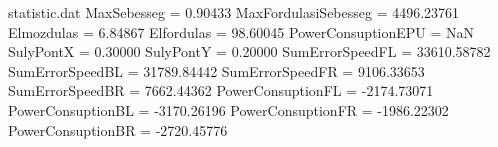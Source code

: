 \begin{filecontents*}{statistic.dat}
MaxSebesseg =    0.90433
MaxFordulasiSebesseg = 4496.23761
Elmozdulas =    6.84867
Elfordulas =   98.60045
PowerConsuptionEPU =        NaN
SulyPontX =    0.30000
SulyPontY =    0.20000
SumErrorSpeedFL = 33610.58782
SumErrorSpeedBL = 31789.84442
SumErrorSpeedFR = 9106.33653
SumErrorSpeedBR = 7662.44362
PowerConsuptionFL = -2174.73071
PowerConsuptionBL = -3170.26196
PowerConsuptionFR = -1986.22302
PowerConsuptionBR = -2720.45776
\end{filecontents*}

